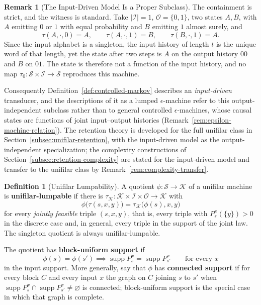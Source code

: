 \documentclass[12pt]{article}
\theoremstyle{definition}
\newtheorem{definition}[theorem]{Definition}
\newtheorem{remark}[theorem]{Remark}
\DeclareMathOperator{\supp}{supp}
\begin{document}
\begin{remark}[The Input-Driven Model Is a Proper Subclass]
\label{rem:unifilar-proper-subclass}
The containment is strict, and the witness is standard.  Take
$|\mathcal I|=1$, $\mathcal O=\{0,1\}$, two states $A,B$, with $A$ emitting
$0$ or $1$ with equal probability and $B$ emitting $1$ almost surely, and
\[
\tau(A,\cdot,0)=A,\qquad \tau(A,\cdot,1)=B,\qquad \tau(B,\cdot,1)=A .
\]
Since the input alphabet is a singleton, the input history of length $t$ is
the unique word of that length, yet the state after two steps is $A$ on the
output history $00$ and $B$ on $01$.  The state is therefore not a function of
the input history, and no map $\tau_0:\mathcal S\times\mathcal I\to\mathcal S$
reproduces this machine.

Consequently Definition~\ref{def:controlled-markov} describes an
\emph{input-driven} transducer, and the descriptions of it as a lumped
$\epsilon$-machine refer to this output-independent subclass rather than to
general controlled $\epsilon$-machines, whose causal states are functions of
joint input--output histories
(Remark~\ref{rem:epsilon-machine-relation}).  The retention theory is developed
for the full unifilar class in
Section~\ref{subsec:unifilar-retention}, with the input-driven model as the
output-independent specialization; the complexity constructions of
Section~\ref{subsec:retention-complexity} are stated for the input-driven model
and transfer to the unifilar class by
Remark~\ref{rem:complexity-transfer}.
\end{remark}

\begin{definition}[Unifilar Lumpability]
\label{def:unifilar-lumpable}
A quotient $\phi:\mathcal S\to\mathcal K$ of a unifilar machine is
\textbf{unifilar-lumpable} if there is
$\tau_{\mathcal K}:\mathcal K\times\mathcal I\times\mathcal O\to\mathcal K$
with
\[
\phi\bigl(\tau(s,x,y)\bigr)=\tau_{\mathcal K}\bigl(\phi(s),x,y\bigr)
\]
for every \emph{jointly feasible} triple $(s,x,y)$, that is, every triple with
$P_s^x(\{y\})>0$ in the discrete case and, in general, every triple in the
support of the joint law.  The singleton quotient is always
unifilar-lumpable.

The quotient has \textbf{block-uniform support} if
\[
\phi(s)=\phi(s')
\implies
\supp P_s^x=\supp P_{s'}^x
\qquad\text{for every }x
\]
in the input support.  More generally, say that $\phi$ has \textbf{connected
support} if for every block $C$ and every input $x$ the graph on $C$ joining
$s$ to $s'$ when $\supp P_s^x\cap\supp P_{s'}^x\neq\varnothing$ is connected;
block-uniform support is the special case in which that graph is complete.
\end{definition}
\end{document}
